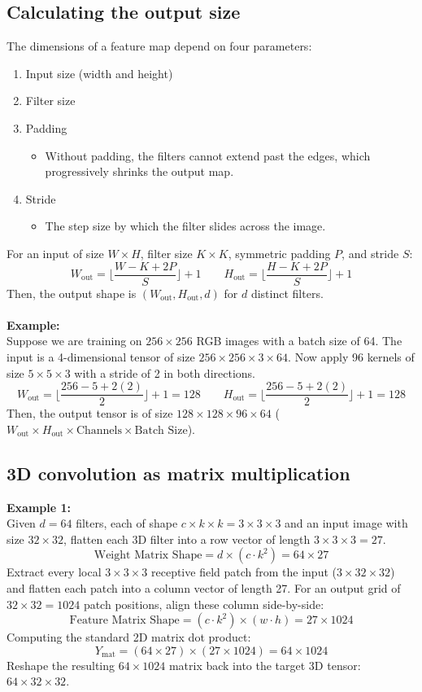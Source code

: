 \documentclass[11pt]{article}
\begin{document}
\subsection{Calculating the output size}
The dimensions of a feature map depend on four parameters:
\begin{enumerate}
    \item Input size (width and height)
    \item Filter size
    \item Padding
    \begin{itemize}
        \item Without padding, the filters cannot extend past the edges, which progressively shrinks the output map.
    \end{itemize}
    \item Stride
    \begin{itemize}
        \item The step size by which the filter slides across the image.
    \end{itemize}
\end{enumerate}
For an input of size $W\times H$, filter size $K\times K$, symmetric padding $P$, and stride $S$:
$$
W_{\text{out}}=\Big\lfloor\frac{W-K+2P}{S}\Big\rfloor+1 \quad\quad
H_{\text{out}}=\Big\lfloor\frac{H-K+2P}{S}\Big\rfloor+1
$$
Then, the output shape is $(W_{\text{out}},H_{\text{out}},d)$ for $d$ distinct filters.
\\\\
\textbf{Example:}\\
Suppose we are training on $256\times 256$ RGB images with a batch size of 64. The input is a 4-dimensional tensor of size $256\times 256\times 3\times 64$.
Now apply 96 kernels of size $5\times 5\times 3$ with a stride of 2 in both directions.
$$
W_{\text{out}}=\Big\lfloor\frac{256-5+2(2)}{2}\Big\rfloor+1=128 \quad\quad
H_{\text{out}}=\Big\lfloor\frac{256-5+2(2)}{2}\Big\rfloor+1=128
$$
Then, the output tensor is of size $128\times 128\times 96\times 64$ ($W_{\text{out}}\times H_{\text{out}}\times \text{Channels}\times \text{Batch Size}$).
\subsection{3D convolution as matrix multiplication}
\textbf{Example 1:}\\
Given $d=64$ filters, each of shape $c\times k\times k=3\times 3\times 3$ and an input image with size $32\times 32$, flatten each 3D filter into a row vector of length $3\times 3\times 3=27$.
$$
\text{Weight Matrix Shape}=d\times (c\cdot k^2)=64\times 27
$$
Extract every local $3\times 3\times 3$ receptive field patch from the input ($3\times 32\times 32$) and flatten each patch into a column vector of length 27.
For an output grid of $32\times 32=1024$ patch positions, align these column side-by-side:
$$
\text{Feature Matrix Shape}=(c\cdot k^2)\times(w\cdot h)=27\times 1024
$$
Computing the standard 2D matrix dot product:
$$
Y_{\text{mat}}=(64\times 27)\times(27\times 1024)=64\times 1024
$$
Reshape the resulting $64\times 1024$ matrix back into the target 3D tensor: $64\times 32\times 32$.
\end{document}
